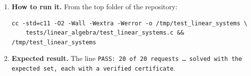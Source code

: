 \documentclass[11pt,a4paper]{article}
\begin{document}
\begin{enumerate}
\item \textbf{How to run it.} From the top folder of the repository:
\begin{verbatim}
cc -std=c11 -O2 -Wall -Wextra -Werror -o /tmp/test_linear_systems \
    tests/linear_algebra/test_linear_systems.c && /tmp/test_linear_systems
\end{verbatim}

\item \textbf{Expected result.} The line \texttt{PASS: 20 of 20 requests \dots{} solved with the expected set, each with a verified certificate}.
\end{enumerate}
\end{document}

